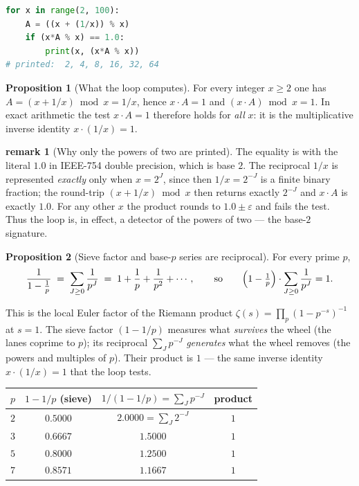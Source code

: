 \documentclass[11pt]{article}
\theoremstyle{definition}
\newtheorem{proposition}{Proposition}
\newtheorem{remark}{remark}
\begin{document}
\begin{lstlisting}[language=Python]
for x in range(2, 100):
    A = ((x + (1/x)) % x)
    if (x*A % x) == 1.0:
        print(x, (x*A % x))
# printed:  2, 4, 8, 16, 32, 64
\end{lstlisting}

\begin{proposition}[What the loop computes]
For every integer $x\ge 2$ one has $A=(x+1/x)\bmod x = 1/x$, hence
$x\cdot A = 1$ and $(x\cdot A)\bmod x = 1$. In exact arithmetic the test
$x\cdot A = 1$ therefore holds for \emph{all} $x$: it is the multiplicative
inverse identity $x\cdot(1/x)=1$.
\end{proposition}

\begin{remark}[Why only the powers of two are printed]
The equality is with the literal $1.0$ in IEEE-754 double precision, which is
base $2$. The reciprocal $1/x$ is represented \emph{exactly} only when
$x=2^{J}$, since then $1/x=2^{-J}$ is a finite binary fraction; the round-trip
$(x+1/x)\bmod x$ then returns exactly $2^{-J}$ and $x\cdot A$ is exactly $1.0$.
For any other $x$ the product rounds to $1.0\pm\varepsilon$ and fails the test.
Thus the loop is, in effect, a detector of the powers of two --- the base-$2$
signature.
\end{remark}

\begin{proposition}[Sieve factor and base-$p$ series are reciprocal]
For every prime $p$,
\[
  \frac{1}{1-\tfrac1p}
  \;=\; \sum_{J\ge 0} \frac{1}{p^{J}}
  \;=\; 1+\frac1p+\frac1{p^{2}}+\cdots,
  \qquad\text{so}\qquad
  \Bigl(1-\tfrac1p\Bigr)\cdot\sum_{J\ge 0}\frac{1}{p^{J}} = 1 .
\]
\end{proposition}

\noindent This is the local Euler factor of the Riemann product
$\zeta(s)=\prod_p (1-p^{-s})^{-1}$ at $s=1$. The sieve factor $(1-1/p)$ measures
what \emph{survives} the wheel (the lanes coprime to $p$); its reciprocal
$\sum_J p^{-J}$ \emph{generates} what the wheel removes (the powers and multiples
of $p$). Their product is $1$ --- the same inverse identity $x\cdot(1/x)=1$ that
the loop tests.

\begin{center}
\begin{tabular}{c c c c}
\hline
$p$ & $1-1/p$ (sieve) & $1/(1-1/p)=\sum_J p^{-J}$ & product\\
\hline
$2$ & $0.5000$ & $2.0000=\sum_J 2^{-J}$ & $1$\\
$3$ & $0.6667$ & $1.5000$ & $1$\\
$5$ & $0.8000$ & $1.2500$ & $1$\\
$7$ & $0.8571$ & $1.1667$ & $1$\\
\hline
\end{tabular}
\end{center}
\end{document}
